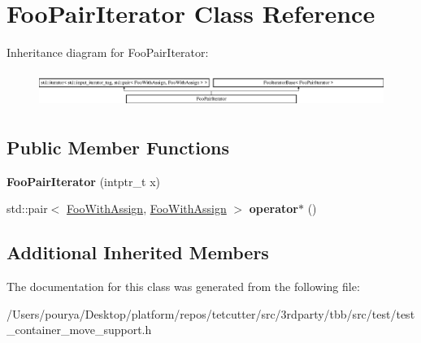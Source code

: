 \hypertarget{classFooPairIterator}{}\section{Foo\+Pair\+Iterator Class Reference}
\label{classFooPairIterator}
Inheritance diagram for Foo\+Pair\+Iterator\+:\begin{figure}[H]
\begin{center}
\leavevmode
\includegraphics[height=1.166667cm]{classFooPairIterator}
\end{center}
\end{figure}
\subsection*{Public Member Functions}
\begin{DoxyCompactItemize}
\item 
\hypertarget{classFooPairIterator_af08bd73251d8c6f84f27e27f3a8505d1}{}{\bfseries Foo\+Pair\+Iterator} (intptr\+\_\+t x)\label{classFooPairIterator_af08bd73251d8c6f84f27e27f3a8505d1}

\item 
\hypertarget{classFooPairIterator_a6e5b4a6f0804cc37d1fc60084854e65a}{}std\+::pair$<$ \hyperlink{classFooWithAssign}{Foo\+With\+Assign}, \hyperlink{classFooWithAssign}{Foo\+With\+Assign} $>$ {\bfseries operator$\ast$} ()\label{classFooPairIterator_a6e5b4a6f0804cc37d1fc60084854e65a}

\end{DoxyCompactItemize}
\subsection*{Additional Inherited Members}


The documentation for this class was generated from the following file\+:\begin{DoxyCompactItemize}
\item 
/\+Users/pourya/\+Desktop/platform/repos/tetcutter/src/3rdparty/tbb/src/test/test\+\_\+container\+\_\+move\+\_\+support.\+h\end{DoxyCompactItemize}

